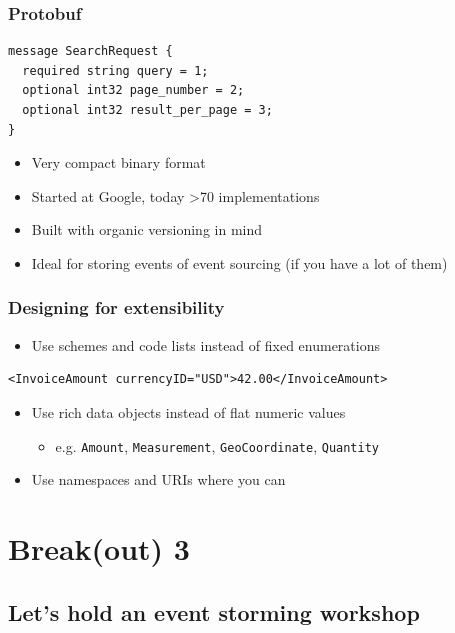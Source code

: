 \documentclass[8pt]{article}
\begin{document}
\subsubsection{Protobuf}
\label{sec:org01abba2}
\begin{verbatim}
message SearchRequest {
  required string query = 1;
  optional int32 page_number = 2;
  optional int32 result_per_page = 3;
}
\end{verbatim}

\begin{itemize}
\item Very compact binary format
\item Started at Google, today >70 implementations
\item Built with organic versioning in mind
\item Ideal for storing events of event sourcing (if you have a lot of them)
\end{itemize}
\subsubsection{Designing for extensibility}
\label{sec:orgd8679f5}
\begin{itemize}
\item Use schemes and code lists instead of fixed enumerations
\end{itemize}
\begin{verbatim}
<InvoiceAmount currencyID="USD">42.00</InvoiceAmount>
\end{verbatim}

\begin{itemize}
\item Use rich data objects instead of flat numeric values
\begin{itemize}
\item e.g. \texttt{Amount}, \texttt{Measurement}, \texttt{GeoCoordinate}, \texttt{Quantity}
\end{itemize}

\item Use namespaces and URIs where you can
\end{itemize}
\section{Break(out) 3}
\label{sec:orgcf0bb20}
\subsection{Let's hold an event storming workshop}
\label{sec:org6f4a23c}
\end{document}
